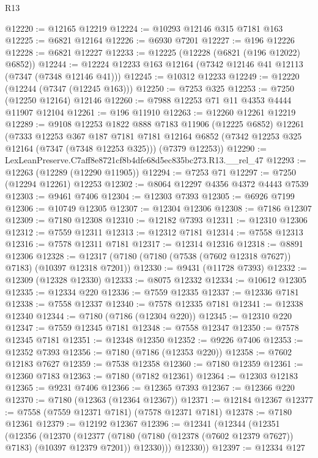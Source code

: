 \begin{lexlean}{R13}
\begin{coremodule}
@12220 := @12165 @12219
@12224 := @10293 @12146 @315 @7181 @163
@12225 := @6821 @12164
@12226 := @6930 @7201
@12227 := @196 @12226
@12228 := @6821 @12227
@12233 := @12225 (@12228 (@6821 (@196 @12022) @6852))
@12244 := @12224 @12233 @163 @12164 (@7342 @12146 @41 @12113 (@7347 (@7348 @12146 @41)))
@12245 := @10312 @12233
@12249 := @12220 (@12244 (@7347 (@12245 @163)))
@12250 := @7253 @325
@12253 := @7250 (@12250 @12164) @12146
@12260 := @7988 @12253 @71 @11 @4353 @4444 @11907 @12104
@12261 := @196 @11910
@12263 := @12260 @12261 @12219
@12289 := @9108
    @12253
    @1822
    @888
    @7183
    @11906
    (@12225 @6852)
    @12261
    (@7333
      @12253
      @367
      @187
      @7181
      @7181
      @12164
      @6852
      (@7342 @12253 @325 @12164 (@7347 (@7348 @12253 @325)))
      (@7379 @12253))
@12290 := LexLeanPreserve.C7aff8e8721cf8b4dfe68d5ec835bc273.R13.__rel_47
@12293 := @12263 (@12289 (@12290 @11905))
@12294 := @7253 @71
@12297 := @7250 (@12294 @12261) @12253
@12302 := @8064 @12297 @4356 @4372 @4443 @7539
@12303 := @9461 @7406
@12304 := @12303 @7393
@12305 := @6926 @7199
@12306 := @10749 @12305
@12307 := @12304 @12306
@12308 := @7186 @12307
@12309 := @7180 @12308
@12310 := @12182 @7393
@12311 := @12310 @12306
@12312 := @7559 @12311
@12313 := @12312 @7181
@12314 := @7558 @12313
@12316 := @7578 @12311 @7181
@12317 := @12314 @12316
@12318 := @8891 @12306
@12328 := @12317 (@7180 (@7180 (@7538 (@7602 @12318 @7627)) @7183) (@10397 @12318 @7201))
@12330 := @9431 (@11728 @7393)
@12332 := @12309 (@12328 @12330)
@12333 := @8075 @12332
@12334 := @10612 @12305
@12335 := @12334 @220
@12336 := @7559 @12335
@12337 := @12336 @7181
@12338 := @7558 @12337
@12340 := @7578 @12335 @7181
@12341 := @12338 @12340
@12344 := @7180 (@7186 (@12304 @220))
@12345 := @12310 @220
@12347 := @7559 @12345 @7181
@12348 := @7558 @12347
@12350 := @7578 @12345 @7181
@12351 := @12348 @12350
@12352 := @9226 @7406
@12353 := @12352 @7393
@12356 := @7180 (@7186 (@12353 @220))
@12358 := @7602 @12183 @7627
@12359 := @7538 @12358
@12360 := @7180 @12359
@12361 := @12360 @7183
@12363 := @7180 (@7182 @12361)
@12364 := @12303 @12183
@12365 := @9231 @7406
@12366 := @12365 @7393
@12367 := @12366 @220
@12370 := @7180 (@12363 (@12364 @12367))
@12371 := @12184 @12367
@12377 := @7558 (@7559 @12371 @7181) (@7578 @12371 @7181)
@12378 := @7180 @12361
@12379 := @12192 @12367
@12396 := @12341
    (@12344
      (@12351
        (@12356
          (@12370
            (@12377
              (@7180 (@7180 (@12378 (@7602 @12379 @7627)) @7183) (@10397 @12379 @7201))
              @12330)))
        @12330))
@12397 := @12334 @127

\end{coremodule}
\end{lexlean}
